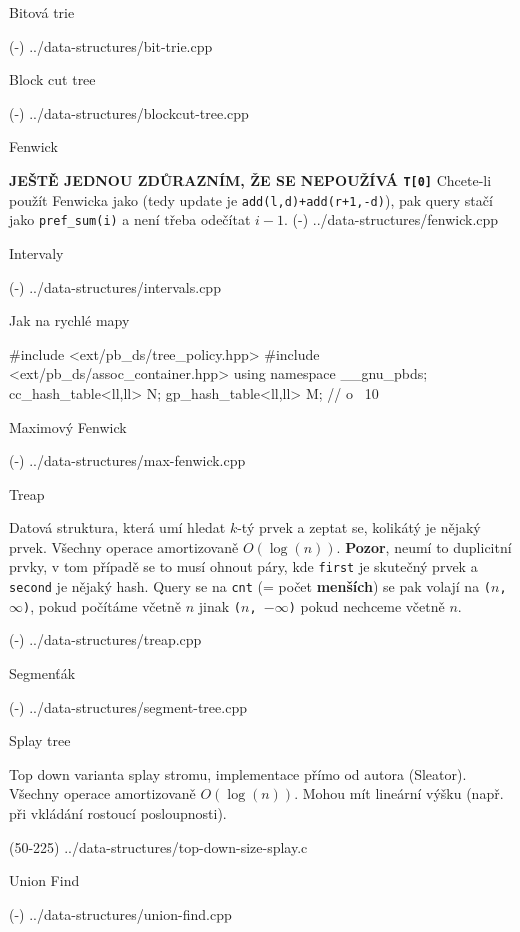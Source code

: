 \sec Bitová trie 

\verbinput (-) ../data-structures/bit-trie.cpp

\sec Block cut tree 

\verbinput (-) ../data-structures/blockcut-tree.cpp

\sec Fenwick

{\bf JEŠTĚ JEDNOU ZDŮRAZNÍM, ŽE SE NEPOUŽÍVÁ {\tt T[0]}}\linebreak
Chcete-li použít Fenwicka jako  (tedy update je {\tt add(l,d)+add(r+1,-d)}), pak query stačí jako {\tt pref\_sum(i)} a není třeba odečítat $i-1$.
\verbinput (-) ../data-structures/fenwick.cpp

\sec Intervaly

\verbinput (-) ../data-structures/intervals.cpp

\sec Jak na rychlé mapy 

\begtt
#include <ext/pb_ds/tree_policy.hpp>
#include <ext/pb_ds/assoc_container.hpp>
using namespace __gnu_pbds;
cc_hash_table<ll,ll> N;
gp_hash_table<ll,ll> M; // o ~10%
\endtt

\sec Maximový Fenwick 

\verbinput (-) ../data-structures/max-fenwick.cpp

\sec Treap

Datová struktura, která umí hledat $k$-tý prvek a zeptat se, kolikátý je nějaký prvek.
Všechny operace amortizovaně $O(\log(n))$.
{\bf Pozor}, neumí to duplicitní prvky, v tom případě se to musí ohnout páry, kde {\tt first} je skutečný prvek a {\tt second} je nějaký hash.
Query se na {\tt cnt} (= počet {\bf menších}) se pak volají na {\tt ($n$, $\infty$)}, pokud počítáme včetně $n$ jinak {\tt ($n$, $-\infty$)} pokud nechceme včetně $n$.

\verbinput (-) ../data-structures/treap.cpp

\sec Segmenťák

\verbinput (-) ../data-structures/segment-tree.cpp

\sec Splay tree

Top down varianta splay stromu, implementace přímo od autora (Sleator).
Všechny operace amortizovaně $O(\log(n))$.
Mohou mít lineární výšku (např. při vkládání rostoucí posloupnosti).

\verbinput (50-225) ../data-structures/top-down-size-splay.c

\sec Union Find 

\verbinput (-) ../data-structures/union-find.cpp

